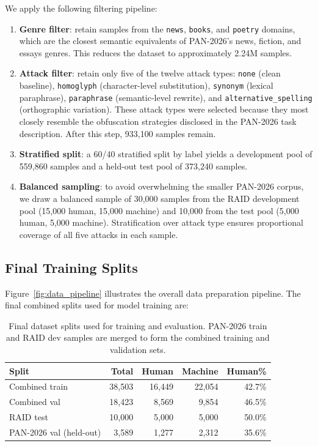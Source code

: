 \documentclass[]{ceurart}
\begin{document}
We apply the following filtering pipeline:
\begin{enumerate}
  \item \textbf{Genre filter}: retain samples from the \texttt{news}, \texttt{books}, and \texttt{poetry} domains, which are the closest semantic equivalents of PAN-2026's news, fiction, and essays genres. This reduces the dataset to approximately 2.24M samples.
  \item \textbf{Attack filter}: retain only five of the twelve attack types: \texttt{none} (clean baseline), \texttt{homoglyph} (character-level substitution), \texttt{synonym} (lexical paraphrase), \texttt{paraphrase} (semantic-level rewrite), and \texttt{alternative\_spelling} (orthographic variation). These attack types were selected because they most closely resemble the obfuscation strategies disclosed in the PAN-2026 task description. After this step, 933,100 samples remain.
  \item \textbf{Stratified split}: a 60/40 stratified split by label yields a development pool of 559,860 samples and a held-out test pool of 373,240 samples.
  \item \textbf{Balanced sampling}: to avoid overwhelming the smaller PAN-2026 corpus, we draw a balanced sample of 30,000 samples from the RAID development pool (15,000 human, 15,000 machine) and 10,000 from the test pool (5,000 human, 5,000 machine). Stratification over attack type ensures proportional coverage of all five attacks in each sample.
\end{enumerate}

\subsection{Final Training Splits}

Figure~\ref{fig:data_pipeline} illustrates the overall data preparation pipeline. The final combined splits used for model training are:

\begin{table}[t]
  \caption{Final dataset splits used for training and evaluation. PAN-2026 train and RAID dev samples are merged to form the combined training and validation sets.}
  \label{tab:splits}
  \begin{tabular}{lrrrr}
    \toprule
    Split & Total & Human & Machine & Human\% \\
    \midrule
    Combined train & 38,503 & 16,449 & 22,054 & 42.7\% \\
    Combined val   & 18,423 &  8,569 &  9,854 & 46.5\% \\
    RAID test      & 10,000 &  5,000 &  5,000 & 50.0\% \\
    PAN-2026 val (held-out) & 3,589 & 1,277 & 2,312 & 35.6\% \\
    \bottomrule
  \end{tabular}
\end{table}
\end{document}
